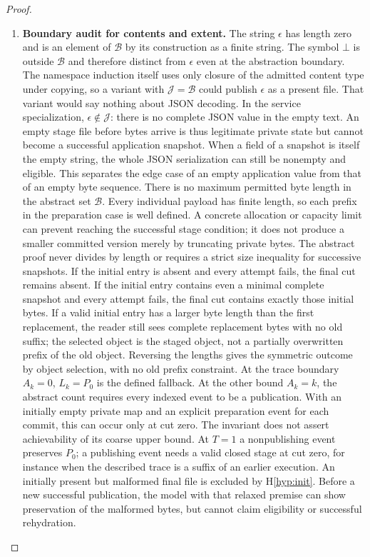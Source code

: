 \documentclass[12pt]{article}
\newcommand{\Bytes}{\mathcal{B}}
\newcommand{\Valid}{\mathcal{J}}
\newcommand{\absent}{\bot}
\begin{document}
\begin{proof}
\begin{enumerate}
\item \textbf{Boundary audit for contents and extent.}
The string $\epsilon$ has length zero and is an element
of $\Bytes$ by its construction as a finite string.
The symbol $\absent$ is outside $\Bytes$ and therefore distinct
from $\epsilon$ even at the abstraction boundary.
The namespace induction itself uses only closure of the
admitted content type under copying, so a variant with
$\Valid=\Bytes$ could publish $\epsilon$ as a present file.
That variant would say nothing about JSON decoding.
In the service specialization, $\epsilon\notin\Valid$:
there is no complete JSON value in the empty text.
An empty stage file before bytes arrive is thus legitimate
private state but cannot become a successful application snapshot.
When a field of a snapshot is itself the empty string, the
whole JSON serialization can still be nonempty and eligible.
This separates the edge case of an empty application value
from that of an empty byte sequence.
There is no maximum permitted byte length in the abstract set
$\Bytes$. Every individual payload has finite length, so
each prefix in the preparation case is well defined.
A concrete allocation or capacity limit can prevent reaching
the successful stage condition; it does not produce a smaller
committed version merely by truncating private bytes.
The abstract proof never divides by length or requires a strict
size inequality for successive snapshots.
If the initial entry is absent and every attempt fails,
the final cut remains absent. If the initial entry contains
even a minimal complete snapshot and every attempt fails,
the final cut contains exactly those initial bytes.
If a valid initial entry has a larger byte length than the
first replacement, the reader still sees complete replacement
bytes with no old suffix; the selected object is the staged
object, not a partially overwritten prefix of the old object.
Reversing the lengths gives the symmetric outcome by object
selection, with no old prefix constraint.
At the trace boundary $A_k=0$, $L_k=P_0$ is the defined
fallback. At the other bound $A_k=k$, the abstract count
requires every indexed event to be a publication. With an
initially empty private map and an explicit preparation event
for each commit, this can occur only at cut zero. The invariant
does not assert achievability of its coarse upper bound.
At $T=1$ a nonpublishing event preserves $P_0$; a publishing
event needs a valid closed stage at cut zero, for instance
when the described trace is a suffix of an earlier execution.
An initially present but malformed final file is excluded by
H\ref{hyp:init}. Before a new successful publication, the model
with that relaxed premise can show preservation of the malformed
bytes, but cannot claim eligibility or successful rehydration.



\end{enumerate}
\end{proof}
\end{document}
